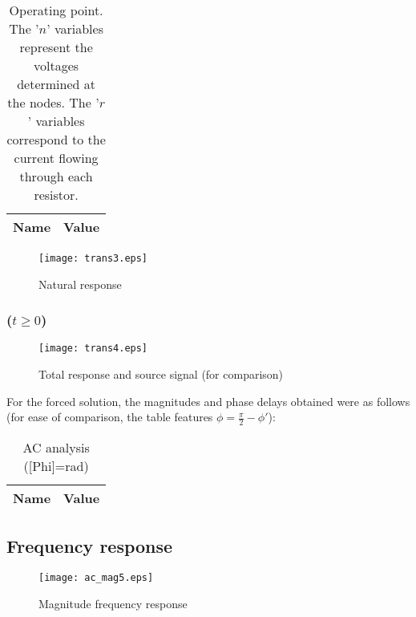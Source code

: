 \begin{table}[H]
	\centering
	\begin{tabular}{|l|c|}
		\hline    
		    {\bf Name} & {\bf Value} \\
                    \hline
                    \hline
		
	\end{tabular}
	\caption{Operating point. The '$n$' variables represent the voltages determined at the nodes. The '$r$' variables correspond to the current flowing through each resistor.}
	\label{tab:op2}
\end{table}

\begin{figure}[H]
  \centering
  \texttt{[image: trans3.eps]}
  \caption{Natural response}
  \label{fig:nat_sim}
\end{figure}

\subsubsection{($ t \geq 0$)}

\begin{figure}[H]
  \centering
  \texttt{[image: trans4.eps]}
  \caption{Total response and source signal (for comparison)}
  \label{fig:tot:sim}
\end{figure}

For the forced solution, the magnitudes and phase delays obtained were as follows (for ease of comparison, the table features $\phi = \frac{\pi}{2} - \phi'$):

\begin{table}[H]
	\centering
	\begin{tabular}{|l|c|}
		\hline    
		    {\bf Name} & {\bf Value} \\
                    \hline
                    \hline
		
	\end{tabular}
	\caption{AC analysis ([Phi]=rad)}
	\label{tab:op1}
\end{table}

\subsection{Frequency response}

\begin{figure}[H]
  \centering
  \texttt{[image: ac\_mag5.eps]}
  \caption{Magnitude frequency response}
  \label{freq_resp_mag_sim}
\end{figure}


